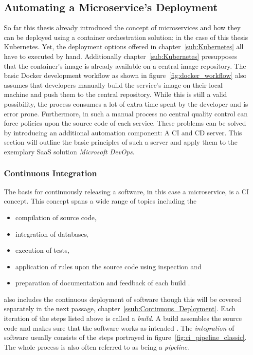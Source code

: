 
\subsection{Automating a Microservice's Deployment}%
\label{sub:Automatic_a_Microservices_Deployment}
So far this thesis already introduced the concept of microservices and how they
can be deployed using a container orchestration solution; in the case of this
thesis Kubernetes. Yet, the deployment options offered in
chapter~\ref{sub:Kubernetes} all have to executed by hand. Additionally
chapter~\ref{sub:Kubernetes} presupposes that the container's image is already
available on a central image repository. The basic Docker development workflow
as shown in figure~\ref{fig:docker_workflow} also assumes that developers
manually build the service's image on their local machine and push them to the
central repository. While this is still a valid possibility, the process
consumes a lot of extra time spent by the developer and is error prone.
Furthermore, in such a manual process no central quality control can force
policies upon the source code of each service. These problems can be solved by
introducing an additional automation component: A \acf{CI} and \ac{CD} server.
This section will outline the basic principles of such a server and apply them
to the exemplary \ac{SaaS} solution \textit{Microsoft DevOps}.

\subsubsection{Continuous Integration}%
\label{ssub:Continuous_Integration}
The basis for continuously releasing a software, in this case a microservice,
is a \ac{CI} concept. This concept spans a wide range of topics including the
\begin{itemize}
  \item compilation of source code,
  \item integration of databases,
  \item execution of tests,
  \item application of rules upon the source code using inspection and
  \item preparation of documentation and feedback of each build \autocite[pp.
    12-20]{MatyasContinuousIntegration2007}.
\end{itemize}

\autocite{MatyasContinuousIntegration2007} also includes the continuous
deployment of software though this will be covered separately in the next
passage, chapter~\ref{ssub:Continuous_Deployment}. Each iteration of the steps
listed above is called a \textit{build}. A build assembles the source code and
makes sure that the software works as intended \autocite[p.
4]{MatyasContinuousIntegration2007}. The \textit{integration} of software
usually consists of the steps portrayed in
figure~\ref{fig:ci_pipeline_classic}. The whole process is also often referred
to as being a \textit{pipeline}.

